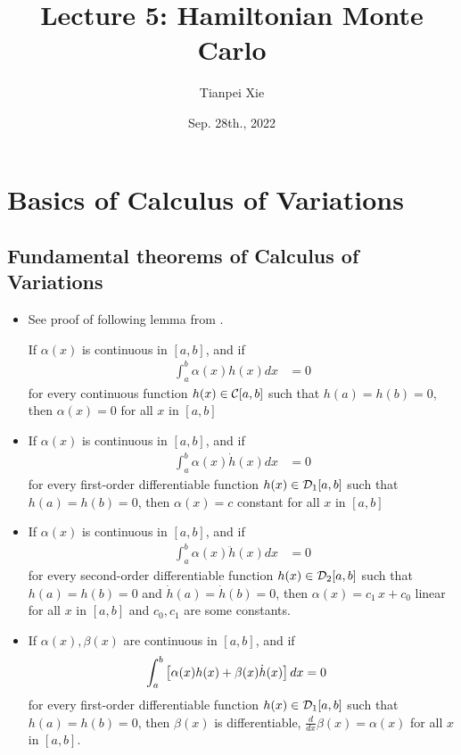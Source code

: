 \documentclass[11pt]{article}
\begin{document}
\title{Lecture 5: Hamiltonian Monte Carlo}
\author{ Tianpei Xie}
\date{Sep. 28th., 2022 }
\maketitle
\tableofcontents
\newpage
\allowdisplaybreaks
\section{Basics of Calculus of Variations}
\subsection{Fundamental theorems of Calculus of Variations}
\begin{itemize}
\item See proof of following lemma from \citep{gelfand2000calculus}.
\begin{lemma} If $\alpha(x)$ is continuous in $[a, b]$, and if
\begin{align}
\int_{a}^{b} \alpha(x) h(x) dx &= 0 \label{eqn: cal_var_lemma_1}
\end{align}
for every continuous function $h(x) \in {\mathcal C}[a, b]$ such that $h(a) = h(b) = 0$, then $\alpha(x) = 0$
for all $x$ in $[a, b]$
\end{lemma}

\item \begin{lemma} If $\alpha(x)$ is continuous in $[a, b]$, and if
\begin{align*}
\int_{a}^{b} \alpha(x) \dot{h}(x) dx &= 0 
\end{align*}
for every first-order differentiable function $h(x) \in {\mathcal D}_{1}[a, b]$ such that $h(a) = h(b) = 0$, then $\alpha(x) = c$ constant
for all $x$ in $[a, b]$
\end{lemma}

\item \begin{lemma} If $\alpha(x)$ is continuous in $[a, b]$, and if
\begin{align*}
\int_{a}^{b} \alpha(x) \ddot{h}(x) dx &= 0 
\end{align*}
for every second-order differentiable function $h(x) \in {\mathcal D}_{2}[a, b]$ such that $h(a) = h(b) = 0$ and $\dot{h}(a) = \dot{h}(b) = 0$, then $\alpha(x) = c_1\,x + c_0$ linear
for all $x$ in $[a, b]$ and $c_0, c_1$ are some constants.
\end{lemma}

\item \begin{lemma} If $\alpha(x), \beta(x)$ are continuous in $[a, b]$, and if
\begin{align}
\int_{a}^{b} \left[\alpha(x) h(x) + \beta(x) \dot{h}(x)\right] dx&= 0 \label{eqn: cal_var_lemma_4}
\end{align}
for every first-order differentiable function $h(x) \in {\mathcal D}_{1}[a, b]$ such that $h(a) = h(b) = 0$, then $\beta(x)$ is differentiable, $\frac{d}{dx}\beta(x) = \alpha(x)$
for all $x$ in $[a, b]$.
\end{lemma}


\end{itemize}
\end{document}

